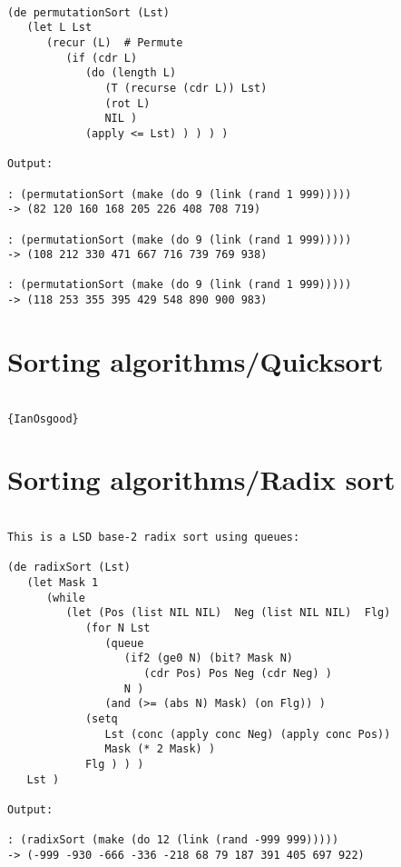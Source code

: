\begin{verbatim}

(de permutationSort (Lst)
   (let L Lst
      (recur (L)  # Permute
         (if (cdr L)
            (do (length L)
               (T (recurse (cdr L)) Lst)
               (rot L)
               NIL )
            (apply <= Lst) ) ) ) )

Output:

: (permutationSort (make (do 9 (link (rand 1 999)))))
-> (82 120 160 168 205 226 408 708 719)

: (permutationSort (make (do 9 (link (rand 1 999)))))
-> (108 212 330 471 667 716 739 769 938)

: (permutationSort (make (do 9 (link (rand 1 999)))))
-> (118 253 355 395 429 548 890 900 983)

\end{verbatim}

\section*{Sorting algorithms/Quicksort}

\begin{verbatim}

{IanOsgood}

\end{verbatim}

\section*{Sorting algorithms/Radix sort}

\begin{verbatim}

This is a LSD base-2 radix sort using queues:

(de radixSort (Lst)
   (let Mask 1
      (while
         (let (Pos (list NIL NIL)  Neg (list NIL NIL)  Flg)
            (for N Lst
               (queue
                  (if2 (ge0 N) (bit? Mask N)
                     (cdr Pos) Pos Neg (cdr Neg) )
                  N )
               (and (>= (abs N) Mask) (on Flg)) )
            (setq
               Lst (conc (apply conc Neg) (apply conc Pos))
               Mask (* 2 Mask) )
            Flg ) ) )
   Lst )

Output:

: (radixSort (make (do 12 (link (rand -999 999)))))
-> (-999 -930 -666 -336 -218 68 79 187 391 405 697 922)

\end{verbatim}

